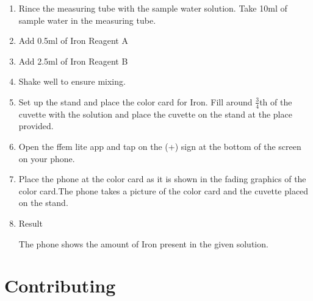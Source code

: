 \documentclass{article}
\begin{document}
 \begin{enumerate}
 \item Rince the measuring tube with the sample water solution. Take 10ml of sample water in the measuring tube.
 \item Add 0.5ml of Iron Reagent A
 \item Add 2.5ml of Iron Reagent B
 \item Shake well to ensure mixing.
 \item Set up the stand and place the color card for Iron. Fill around $\frac{3}{4}$th of the cuvette with  the solution and place the cuvette on the stand at the place provided.
  \item Open the ffem lite app and tap on the (+) sign at the bottom of the screen on your phone.
 \item Place the phone at the color card as it is shown in the fading graphics of the color card.The phone takes a picture of the color card and the cuvette placed on the stand.
 \item Result 
 
 The phone shows the amount of Iron present in the given solution.
 \end{enumerate}
    
    \section{Contributing}
\end{document}
